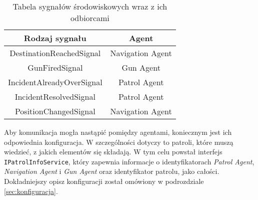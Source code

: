 \begin{table}
    \centering
    \begin{tabular}{|c|c|} 
     \hline
     Rodzaj sygnału & Agent \\
     \hline
     \hline
     DestinationReachedSignal & Navigation Agent \\ 
     \hline
     GunFiredSignal & Gun Agent \\ 
     \hline
     IncidentAlreadyOverSignal & Patrol Agent \\ 
     \hline
     IncidentResolvedSignal & Patrol Agent \\ 
     \hline
     PositionChangedSignal & Navigation Agent \\ 
     \hline
    \end{tabular}
    \caption{Tabela sygnałów środowiskowych wraz z ich odbiorcami}
    \label{tab:agentsEnvironmentSignals}
\end{table}

\par Aby komunikacja mogła nastąpić pomiędzy agentami, koniecznym jest ich odpowiednia konfiguracja. W szczególności dotyczy to patroli, które muszą wiedzieć, z jakich elementów się składają. W tym celu powstał interfejs \texttt{IPatrolInfoService}, który zapewnia informacje o identyfikatorach \emph{Patrol Agent}, \emph{Navigation Agent} i \emph{Gun Agent} oraz identyfikator patrolu, jako całości. Dokładniejszy opisz konfiguracji został omówiony w podrozdziale \ref{sec:konfiguracja}.